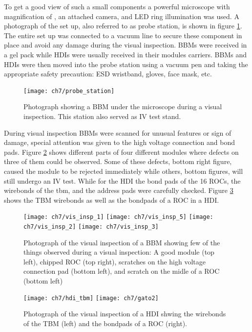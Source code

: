 To get a good view of such a small components a powerful microscope with magnification of {}, an attached camera, and LED ring illumination was used. A photograph of the set up, also referred to as probe station, is shown in figure \ref{fig:probe_station}. The entire set up was connected to a vacuum line to secure these component in place and avoid any damage during the visual inspection. BBMs were received in a gel pack while HDIs were usually received in their modules carriers. BBMs and HDIs were then moved into the probe station using a vacuum pen and taking the appropriate safety precaution: ESD wristband, gloves, face mask, etc.

\begin{figure}[!h]
	\centering
	\texttt{[image: ch7/probe\_station]}
	\caption[Photograph of the visual inspection and IV test station.]{Photograph showing a BBM under the microscope during a visual inspection. This station also served as IV test stand.}
	\label{fig:probe_station}
\end{figure}

During visual inspection BBMs were scanned for unusual features or sign of damage, special attention was given to the high voltage connection and bond pads. Figure \ref{fig:vis_insp_bbm} shows different parts of four different modules where defects on three of them could be observed. Some of these defects, bottom right figure, caused the module to be rejected immediately while others, bottom figures, will still undergo an IV test. While for the HDI the bond pads of the 16 ROCs, the wirebonds of the tbm, and the address pads were carefully checked. Figure \ref{fig:vis_insp_hdi} shows the TBM wirebonds as well as the bondpads of a ROC in a HDI.

\begin{figure}[!h]
	\centering
	\texttt{[image: ch7/vis\_insp\_1]}
	\texttt{[image: ch7/vis\_insp\_5]}
	\texttt{[image: ch7/vis\_insp\_2]}
	\texttt{[image: ch7/vis\_insp\_3]}
	\caption[Visual inspection of a bare module.]{Photograph of the visual inspection of a BBM showing few of the things observed during a visual inspection: A good module (top left), chipped ROC (top right), scratches on the high voltage connection pad (bottom left), and scratch on the midle of a ROC (bottom left)}
	\label{fig:vis_insp_bbm}
\end{figure}

\begin{figure}[!h]
	\centering
	\texttt{[image: ch7/hdi\_tbm]}
	\texttt{[image: ch7/gato2]}
	\caption[Visual inspection of a HDI.]{Photograph of the visual inspection of a HDI shwing the wirebonds of the TBM (left) and the bondpads of a ROC (right). {}}
	\label{fig:vis_insp_hdi}
\end{figure}


